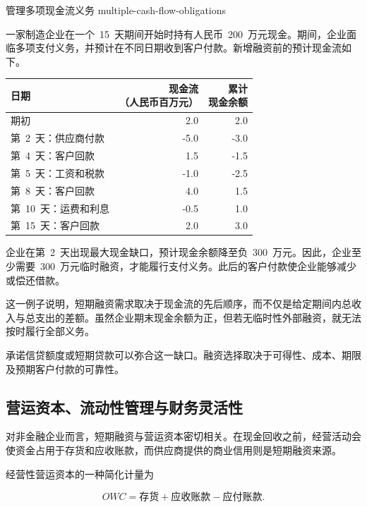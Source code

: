 \begin{example}{管理多项现金流义务}
{multiple-cash-flow-obligations}

一家制造企业在一个~15~天期间开始时持有人民币~200~万元现金。期间，企业面临多项支付义务，并预计在不同日期收到客户付款。新增融资前的预计现金流如下。

\begin{center}
\begin{tabular}{lrr}
\toprule
\textbf{日期} &
\shortstack[c]{\textbf{现金流}\\\textbf{（人民币百万元）}} &
\shortstack[c]{\textbf{累计}\\\textbf{现金余额}} \\
\midrule
期初 & 2.0 & 2.0 \\
第~2~天：供应商付款 & -5.0 & -3.0 \\
第~4~天：客户回款 & 1.5 & -1.5 \\
第~5~天：工资和税款 & -1.0 & -2.5 \\
第~8~天：客户回款 & 4.0 & 1.5 \\
第~10~天：运费和利息 & -0.5 & 1.0 \\
第~15~天：客户回款 & 2.0 & 3.0 \\
\bottomrule
\end{tabular}
\end{center}

企业在第~2~天出现最大现金缺口，预计现金余额降至负~300~万元。因此，企业至少需要~300~万元临时融资，才能履行支付义务。此后的客户付款使企业能够减少或偿还借款。

这一例子说明，短期融资需求取决于现金流的先后顺序，而不仅是给定期间内总收入与总支出的差额。虽然企业期末现金余额为正，但若无临时性外部融资，就无法按时履行全部义务。

承诺信贷额度或短期贷款可以弥合这一缺口。融资选择取决于可得性、成本、期限及预期客户付款的可靠性。

\end{example}

\subsection{营运资本、流动性管理与财务灵活性}

对非金融企业而言，短期融资与营运资本密切相关。在现金回收之前，经营活动会使资金占用于存货和应收账款，而供应商提供的商业信用则是短期融资来源。

经营性营运资本的一种简化计量为

\begin{equation*}
OWC=\text{存货}+\text{应收账款}-\text{应付账款}.
\label{eq:ch7-operating-working-capital}
\end{equation*}

